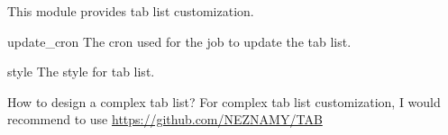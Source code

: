 
This module provides tab list customization.

\begin{Configuration}
    \item[update\_cron]{
        The cron used for the job to update the tab list.
    }

    \item[style]{
        The style for tab list.
    }
\end{Configuration}

\begin{note}{How to design a complex tab list?}
    For complex tab list customization, I would recommend to use \url{https://github.com/NEZNAMY/TAB}
\end{note}